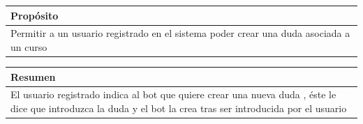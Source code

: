 \clearpage
\begin{table}[!ht]

\begin{tabular}{|m{10cm}|}
\hline\rowcolor{Gray}
{\bf Propósito}\\
\hline
{Permitir a un usuario registrado en el sistema poder crear una duda asociada a un curso} \\
\hline

\end{tabular}


\end{table}

\begin{table}[!ht]

\begin{tabular}{|m{10cm}|}
\hline\rowcolor{Gray}
{\bf Resumen}\\
\hline
{El usuario registrado indica al bot que quiere crear una nueva duda , éste le dice que introduzca la duda y el bot la crea tras ser introducida por el usuario} \\
\hline

\end{tabular}



\end{table}

